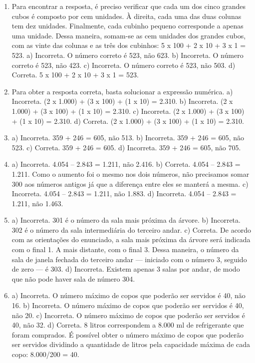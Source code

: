 \begin{enumerate}
\item
Para encontrar a resposta, é preciso verificar que cada um dos 
cinco grandes cubos é composto por cem unidades. À direita, cada uma das 
duas colunas tem dez unidades. Finalmente, cada cubinho pequeno 
corresponde a apenas uma unidade. Dessa maneira, somam-se as cem unidades 
dos grandes cubos, com as vinte das colunas e as três dos cubinhos: 5 x 
100 + 2 x 10 + 3 x 1 = 523.  
a) Incorreta. O número correto é 523, não 623.
b) Incorreta. O número correto é 523, não 423.
c) Incorreta. O número correto é 523, não 503.
d) Correta. 5 x 100 + 2 x 10 + 3 x 1 = 523.

\item
Para obter a resposta correta, basta solucionar a expressão numérica.
a) Incorreta. (2 x 1.000) + (3 x 100) + (1 x 10) = 2.310.
b) Incorreta. (2 x 1.000) + (3 x 100) + (1 x 10) = 2.310.
c) Incorreta. (2 x 1.000) + (3 x 100) + (1 x 10) = 2.310.
d) Correta. (2 x 1.000) + (3 x 100) + (1 x 10) = 2.310.

\item
a) Incorreta. 359 + 246 = 605, não 513.
b) Incorreta. 359 + 246 = 605, não 523.
c) Correta. 359 + 246 = 605.
d) Incorreta. 359 + 246 = 605, não 705.

\item
a) Incorreta. 4.054 -- 2.843 = 1.211, não 2.416.
b) Correta. 4.054 -- 2.843 = 1.211. Como o aumento foi o mesmo
nos dois números, não precisamos somar 300 aos números
antigos já que a diferença entre eles se manterá a mesma.
c) Incorreta. 4.054 -- 2.843 = 1.211, não 1.883.
d) Incorreta. 4.054 -- 2.843 = 1.211, não 1.463.

\item
a) Incorreta. 301 é o número da sala mais próxima da árvore.
b) Incorreta. 302 é o número da sala intermediária do terceiro andar.
c) Correta. De acordo com as orientações do enunciado, a sala mais
próxima da árvore será indicada com o final 1. A mais distante, com o 
final 3. Dessa maneira, o número da sala de janela fechada do terceiro 
andar --- iniciado com o número 3, seguido de zero --- é 303.
d) Incorreta. Existem apenas 3 salas por andar, de modo que não pode
haver sala de número 304.

\item
a) Incorreta. O número máximo de copos que poderão ser servidos é 40, não
16.
b) Incorreta. O número máximo de copos que poderão ser servidos é 40, não 20.
c) Incorreta. O número máximo de copos que poderão ser servidos é 40, não 32.
d) Correta. 8 litros correspondem a 8.000 ml de refrigerante que foram
comprados. É possível obter o número máximo de copos que poderão ser
servidos dividindo a quantidade de litros pela capacidade máxima de 
cada copo: 8.000/200 = 40.


\end{enumerate}

